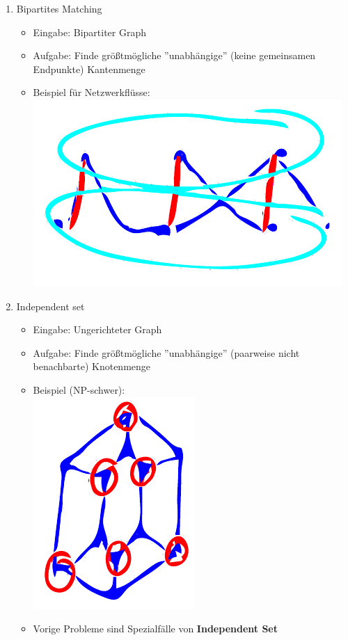 \documentclass{scrartcl}
\begin{document}
\begin{enumerate}
\begin{itemize}
	\end{itemize}
	\item Bipartites Matching
	\begin{itemize}
		\item Eingabe: Bipartiter Graph
		\item Aufgabe: Finde größtmögliche ''unabhängige'' (keine gemeinsamen Endpunkte) Kantenmenge
		\item Beispiel für Netzwerkflüsse: \\
		\includegraphics{figures/bipartites-matching.pdf}
	\end{itemize}
	\item Independent set
	\begin{itemize}
		\item Eingabe: Ungerichteter Graph
		\item Aufgabe: Finde größtmögliche ''unabhängige'' (paarweise nicht benachbarte) Knotenmenge
		\item Beispiel (NP-schwer): \\
		\includegraphics{figures/independent-set.pdf}
		\item Vorige Probleme sind Spezialfälle von \textbf{Independent Set}

\end{itemize}
\end{enumerate}
\end{document}
